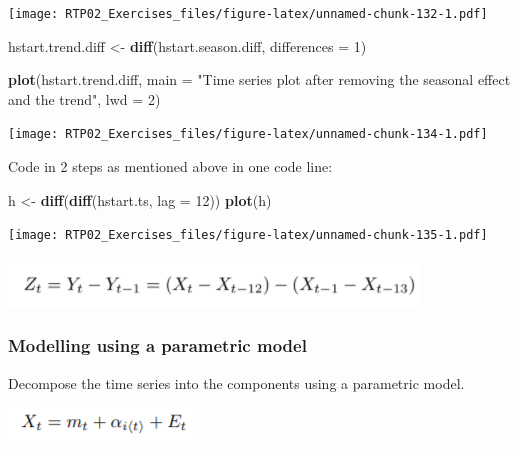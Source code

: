 \documentclass[
]{article}
\newenvironment{Shaded}{\begin{snugshade}}{\end{snugshade}}
\newcommand{\DataTypeTok}[1]{\textcolor[rgb]{0.13,0.29,0.53}{#1}}
\newcommand{\DecValTok}[1]{\textcolor[rgb]{0.00,0.00,0.81}{#1}}
\newcommand{\KeywordTok}[1]{\textcolor[rgb]{0.13,0.29,0.53}{\textbf{#1}}}
\newcommand{\NormalTok}[1]{#1}
\newcommand{\StringTok}[1]{\textcolor[rgb]{0.31,0.60,0.02}{#1}}
\begin{document}
\texttt{[image: RTP02\_Exercises\_files/figure-latex/unnamed-chunk-132-1.pdf]}

\begin{Shaded}
\begin{Highlighting}[]
\NormalTok{hstart.trend.diff <-}\StringTok{ }\KeywordTok{diff}\NormalTok{(hstart.season.diff, }\DataTypeTok{differences =} \DecValTok{1}\NormalTok{)}
\end{Highlighting}
\end{Shaded}

\begin{Shaded}
\begin{Highlighting}[]
\KeywordTok{plot}\NormalTok{(hstart.trend.diff, }\DataTypeTok{main =} \StringTok{"Time series plot after removing the seasonal effect and the trend"}\NormalTok{, }\DataTypeTok{lwd =} \DecValTok{2}\NormalTok{)}
\end{Highlighting}
\end{Shaded}

\texttt{[image: RTP02\_Exercises\_files/figure-latex/unnamed-chunk-134-1.pdf]}

Code in 2 steps as mentioned above in one code line:

\begin{Shaded}
\begin{Highlighting}[]
\NormalTok{h <-}\StringTok{ }\KeywordTok{diff}\NormalTok{(}\KeywordTok{diff}\NormalTok{(hstart.ts, }\DataTypeTok{lag =} \DecValTok{12}\NormalTok{))}
\KeywordTok{plot}\NormalTok{(h)}
\end{Highlighting}
\end{Shaded}

\texttt{[image: RTP02\_Exercises\_files/figure-latex/unnamed-chunk-135-1.pdf]}

\includegraphics[width=0.5\linewidth]{Ex1.2b2}

\hypertarget{modelling-using-a-parametric-model}{%
\subsubsection{Modelling using a parametric
model}\label{modelling-using-a-parametric-model}}

Decompose the time series into the components using a parametric model.

\includegraphics[width=0.3\linewidth]{additive}
\end{document}
